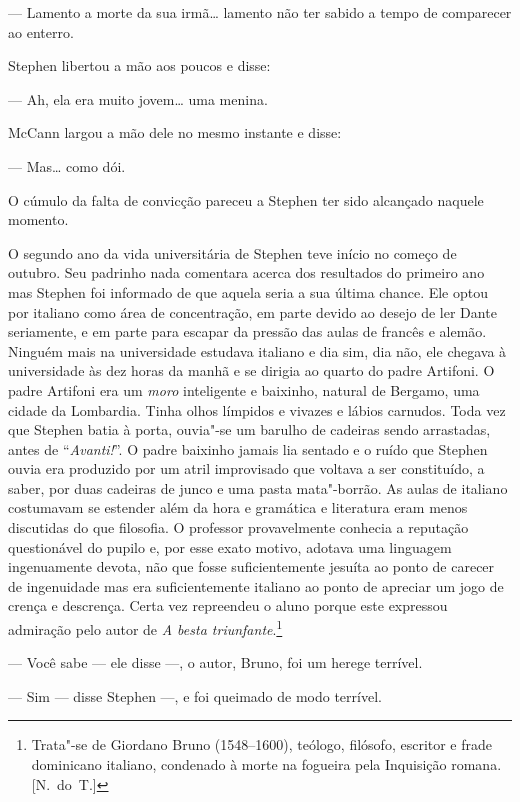 --- Lamento a morte da sua irmã\ldots{} lamento não ter sabido a tempo de comparecer
ao enterro.

Stephen libertou a mão aos poucos e disse:

--- Ah, ela era muito jovem\ldots{} uma menina.

McCann largou a mão dele no mesmo instante e disse:

--- Mas\ldots{} como dói.

O cúmulo da falta de convicção pareceu a Stephen ter sido alcançado naquele
momento.

O segundo ano da vida universitária de Stephen teve início no começo de
outubro.  Seu padrinho nada comentara acerca dos resultados do primeiro ano mas
Stephen foi informado de que aquela seria a sua última chance.  Ele optou por
italiano como área de concentração, em parte devido ao desejo de ler Dante
seriamente, e em parte para escapar da pressão das aulas de francês e alemão.
Ninguém mais na universidade estudava italiano e dia sim, dia não, ele chegava
à universidade às dez horas da manhã e se dirigia ao quarto do padre Artifoni.
O padre Artifoni era um \textit{moro} inteligente e baixinho, natural de		
Bergamo, uma cidade da Lombardia.  Tinha olhos límpidos e vivazes e lábios
carnudos.  Toda vez que Stephen batia à porta, ouvia"-se um barulho de
cadeiras sendo arrastadas, antes de “\textit{Avanti!}”.  O padre baixinho
jamais lia sentado e o ruído que Stephen ouvia era produzido por um atril
improvisado que voltava a ser constituído, a saber, por duas cadeiras de junco		
e uma pasta mata"-borrão.  As aulas de italiano costumavam se estender além da		
hora e gramática e literatura eram menos discutidas do que filosofia.  O
professor provavelmente conhecia a reputação questionável do pupilo e, por esse
exato motivo, adotava uma linguagem ingenuamente devota, não que fosse
suficientemente jesuíta ao ponto de carecer de ingenuidade mas era
suficientemente italiano ao ponto de apreciar um jogo de crença e descrença.
Certa vez repreendeu o aluno porque este expressou admiração pelo autor de
\textit{A besta triunfante}.\footnote[\setcounter{symbol}{1}]{ Trata"-se de Giordano Bruno (1548--1600),
teólogo, filósofo, escritor e frade dominicano italiano, condenado à morte na
fogueira pela Inquisição romana. [N.~do~T.]}

--- Você sabe --- ele disse ---, o autor, Bruno, foi um herege terrível.

--- Sim --- disse Stephen ---, e foi queimado de modo terrível.

